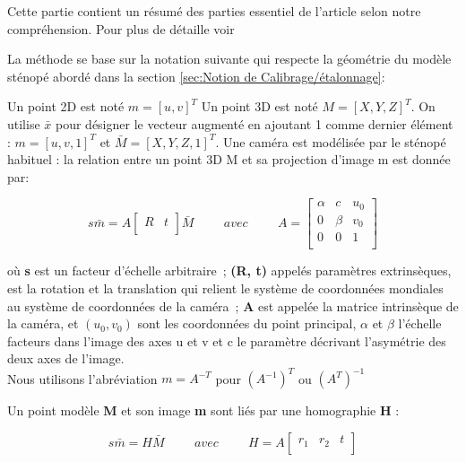  Cette partie contient un résumé des parties essentiel de l'article selon notre compréhension. Pour plus de détaille voir
 \cite{zhengyou_zhang_flexible_1999}  
 
 La méthode se base sur la notation suivante qui respecte la géométrie du modèle sténopé abordé dans la section \ref{sec:Notion de  Calibrage/étalonnage}:
 
 Un point 2D est noté $m = [u, v]^{T}$ Un point 3D est noté $M = [X, Y, Z]^{T}$. On utilise $\bar{x}$ pour désigner le vecteur augmenté en ajoutant 1 comme dernier élément : $m =[u, v, 1]^{T}$ et $\bar{M} = [X, Y, Z, 1]^{T}$. Une caméra est modélisée par le sténopé habituel : la relation entre un point 3D M et sa projection d'image m est donnée par:
 
 
 \begin{equation}
 s\bar{m}= A\left[ 
 \begin{array}{cc}
 	R & t \\
 \end{array} \right]\bar{M}
 \hspace{1cm} 
  avec 
  \hspace{1cm} 
  A
  =
  \left[ 
  \begin{array}{ccc}
  	\alpha & c & u_0 \\
  	0 & \beta & v_0\\
  	0 & 0 & 1 \\
  \end{array} \right] 
  \label{eq:notation}
\end{equation}
   
   
 
 où \textbf{s} est un facteur d'échelle arbitraire ; \textbf{(R, t)} appelés paramètres extrinsèques, est la rotation et la translation qui relient le système de coordonnées mondiales au système de coordonnées de la caméra ; \textbf{A} est appelée la matrice intrinsèque de la caméra, et $(u_0, v_0)$ sont les coordonnées du point principal, $\alpha$ et $\beta $  l'échelle facteurs dans l'image des axes u et v et c le paramètre décrivant l'asymétrie des deux axes de l'image.\\
 Nous utilisons l'abréviation $m = A^{-T}$ pour
 $(A^{-1})^{T}$ ou $(A^{T})^{-1}$
 
  Un point modèle \textbf{M} et son image \textbf{m} sont liés par une homographie \textbf{H} :
  
\begin{equation} 
 s\bar{m}=H\bar{M}
 \hspace{1cm} 
 avec
 \hspace{1cm} 
 H=A
 \left[ 
 \begin{array}{ccc}
 	r_1 & r_2 & t\\
 \end{array} \right]
 \label{eq:homographie}
\end{equation}
 
